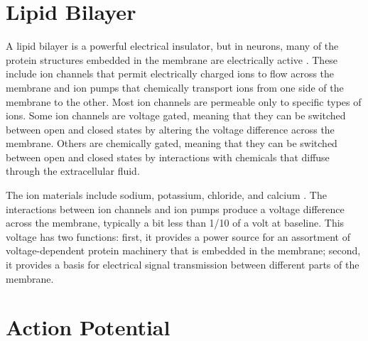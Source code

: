 \documentclass[Orator]{subfiles}
\begin{document}
\section{Lipid Bilayer}
A lipid bilayer is a powerful electrical insulator, but in neurons, many of the protein structures embedded in the membrane are electrically active \cite{}. 
These include ion channels that permit electrically charged ions to flow across the membrane and ion pumps that chemically transport ions from one side of the membrane to the other. Most ion channels are permeable only to specific types of ions.
Some ion channels are voltage gated, meaning that they can be switched between open and closed states by altering the voltage difference across the membrane. 
Others are chemically gated, meaning that they can be switched between open and closed states by interactions with chemicals that diffuse through the extracellular fluid. 




The ion materials include sodium, potassium, chloride, and calcium \footnotemark.  
The interactions between ion channels and ion pumps produce a voltage difference across the membrane, typically a bit less than 1/10 of a volt at baseline. 
This voltage has two functions: first, it provides a power source for an assortment of voltage-dependent protein machinery that is embedded in the membrane; second, it provides a basis for electrical signal transmission between different parts of the membrane.


\section{Action Potential}
\end{document}
